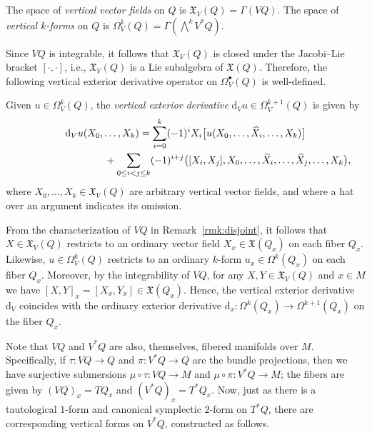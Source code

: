 \documentclass[10pt,a4paper]{amsart}
\numberwithin{equation}{section}
\begin{document}
\begin{Definition} The space of \emph{vertical vector fields} on $Q$ is $ \mathfrak{X} _V (Q) = \Gamma ( V Q ) $. The space of \emph{vertical $k$-forms} on $Q$ is $ \Omega _V ^k ( Q ) = \Gamma ( \bigwedge ^k V ^\ast Q ) $.
\end{Definition}

Since $ V Q $ is integrable, it follows that $ \mathfrak{X} _V ( Q ) $ is closed under the Jacobi--Lie bracket $ [ \cdot , \cdot ] $, i.e., $\mathfrak{X} _V (Q) $ is a Lie subalgebra of $ \mathfrak{X} (Q) $. Therefore, the following vertical exterior derivative operator on $ \Omega _V ^\bullet (Q) $ is well-def\/ined.

\begin{Definition} Given $ u \in \Omega ^k _V (Q) $, the \emph{vertical exterior derivative} $ \mathrm{d} _V u \in \Omega ^{ k + 1 } _V (Q) $
 is given by
\begin{gather*}
\mathrm{d} _V u ( X _0 , \ldots, X _k ) = \sum _{ i = 0 } ^k ( - 1 ) ^i X _i \bigl[ u ( X _0 , \ldots, \widehat{ X } _i , \ldots, X _k ) \bigr] \\
\hphantom{\mathrm{d} _V u ( X _0 , \ldots, X _k ) =}{} + \sum _{ 0 \leq i < j \leq k } ( - 1 ) ^{ i + j } \big( [X _i , X _j ], X _0 , \ldots, \widehat{ X } _i , \ldots, \widehat{ X } _j , \ldots, X _k \big) ,
 \end{gather*}
where $ X _0 , \ldots, X _k \in \mathfrak{X} _V (Q) $ are arbitrary vertical vector f\/ields, and where a hat over an argument indicates its omission.
\end{Definition}

\begin{Remark} From the characterization of $ V Q $ in Remark~\ref{rmk:disjoint}, it follows that $ X \in \mathfrak{X} _V (Q) $ restricts to an ordinary vector f\/ield $ X _x \in \mathfrak{X} ( Q _x ) $ on each f\/iber $Q _x$. Likewise, $ u \in \Omega ^k _V ( Q ) $ restricts to an ordinary $k$-form $ u _x \in \Omega ^k ( Q _x ) $ on each f\/iber $ Q _x $. Moreover, by the integrability of $V Q$, for any $ X, Y \in \mathfrak{X} _V (Q) $ and $ x \in M $ we have $ [ X, Y ] _x = [ X _x , Y _x ] \in \mathfrak{X} ( Q _x ) $. Hence, the vertical exterior derivative $ \mathrm{d} _V $ coincides with the ordinary exterior derivative $ \mathrm{d} _x \colon \Omega ^k ( Q _x ) \rightarrow \Omega ^{ k + 1 } ( Q _x ) $ on the f\/iber $ Q _x $.
\end{Remark}

Note that $ V Q $ and $ V ^\ast Q $ are also, themselves, f\/ibered manifolds over $M$. Specif\/ically, if $ \tau \colon V Q \rightarrow Q $ and $ \pi \colon V ^\ast Q \rightarrow Q $ are the bundle projections, then we have surjective submersions $ \mu \circ \tau \colon V Q \rightarrow M $ and
$ \mu \circ \pi \colon V ^\ast Q \rightarrow M $; the f\/ibers are given by $ (V Q) _x = T Q _x $ and $ (V ^\ast Q) _x = T ^\ast Q _x $. Now,
just as there is a tautological $1$-form and canonical symplectic $2$-form on $ T ^\ast Q $, there are corresponding vertical forms on $ V ^\ast Q $, constructed as follows.
\end{document}
